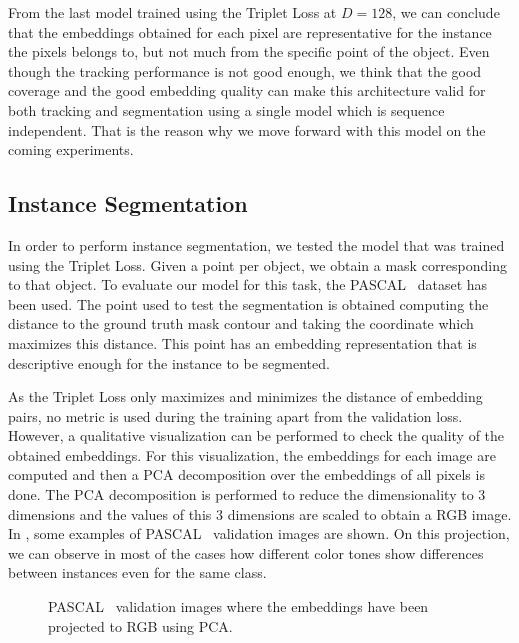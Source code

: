 From the last model trained using the Triplet Loss at $D=128$, we can conclude that the embeddings obtained for each pixel are representative for the instance the pixels belongs to, but not much from the specific point of the object.
Even though the tracking performance is not good enough, we think that the good coverage and the good embedding quality can make this architecture valid for both tracking and segmentation using a single model which is sequence independent.
That is the reason why we move forward with this model on the coming experiments.



\subsection{Instance Segmentation}

In order to perform instance segmentation, we tested the model that was trained using the Triplet Loss.
Given a point per object, we obtain a mask corresponding to that object.
To evaluate our model for this task, the PASCAL~\pascal{} dataset has been used.
The point used to test the segmentation is obtained computing the distance to the ground truth mask contour and taking the coordinate which maximizes this distance.
This point has an embedding representation that is descriptive enough for the instance to be segmented.

As the Triplet Loss only maximizes and minimizes the distance of embedding pairs, no metric is used during the training apart from the validation loss.
However, a qualitative visualization can be performed to check the quality of the obtained embeddings.
For this visualization, the embeddings for each image are computed  and then a PCA decomposition over the embeddings of all pixels is done.
The PCA decomposition is performed to reduce the dimensionality to 3 dimensions and the values of this 3 dimensions are scaled to obtain a RGB image.
In , some examples of PASCAL~\pascal{} validation images are shown.
On this projection, we can observe in most of the cases how different color tones show differences between instances even for the same class.

\begin{figure}[h]
  \centering
  \caption{PASCAL~\pascal{} validation images where the embeddings have been projected to RGB using PCA.}
  \label{fig:experiments:segmentation:pca}
\end{figure}

